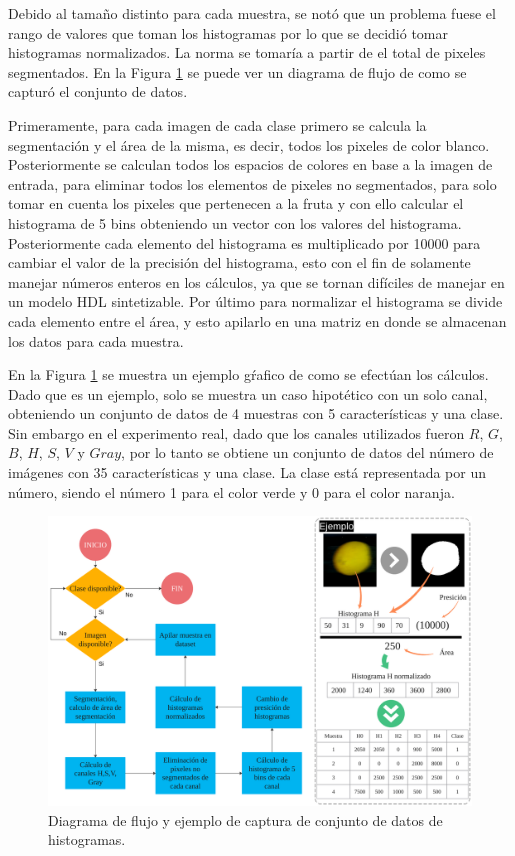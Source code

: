 \documentclass[twoside,spanish,ESP,MSc]{plantillaLabUPV}
\theoremstyle{definition}
\begin{document}
Debido al tamaño distinto para cada muestra, se notó que un problema fuese el rango de valores que toman los histogramas por lo que se decidió tomar histogramas normalizados. La norma se tomaría a partir de el total de pixeles segmentados. En la Figura \ref{fig:dscolor} se puede ver un diagrama de flujo de como se capturó el conjunto de datos. 

Primeramente, para cada imagen de cada clase primero se calcula la segmentación y el área de la misma, es decir, todos los pixeles de color blanco. Posteriormente se calculan todos los espacios de colores en base a la imagen de entrada, para eliminar todos los elementos de pixeles no segmentados, para solo tomar en cuenta los pixeles que pertenecen a la fruta y con ello calcular el histograma de 5 bins obteniendo un vector con los valores del histograma. Posteriormente cada elemento del histograma es multiplicado por 10000 para cambiar el valor de la precisión del histograma, esto con el fin de solamente manejar números enteros en los cálculos, ya que se tornan difíciles de manejar en un modelo HDL sintetizable. Por último para normalizar el histograma se divide cada elemento entre el área, y esto apilarlo en una matriz en donde se almacenan los datos para cada muestra. 

En la Figura \ref{fig:dscolor} se muestra un ejemplo gŕafico de como se efectúan los cálculos. Dado que es un ejemplo, solo se muestra un caso hipotético con un solo canal, obteniendo un conjunto de datos de 4 muestras con 5 características y una clase. Sin embargo en el experimento real, dado que los canales utilizados fueron $R$, $G$, $B$, $H$, $S$, $V$ y $Gray$, por lo tanto se obtiene un conjunto de datos del número de imágenes con 35 características y una clase. La clase está representada por un número, siendo el número 1 para el color verde y 0 para el color naranja.

\begin{figure}
	\centering
	\includegraphics[width=0.9\linewidth]{edrawimas/dscolor}
	\caption{Diagrama de flujo y ejemplo de captura de conjunto de datos de histogramas.}
	\label{fig:dscolor}
\end{figure}
\end{document}
